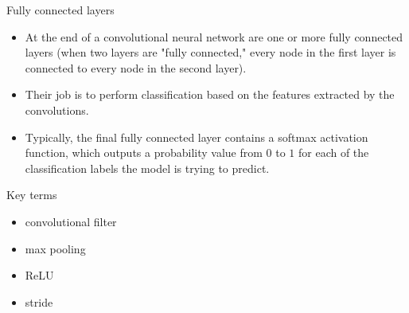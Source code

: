 \documentclass{beamer}
\begin{document}
\begin{frame}{Fully connected layers}
\begin{itemize}
\item At the end of a convolutional neural network are one or more fully connected layers (when two layers are "fully connected," every node in the first layer is connected to every node in the second layer). 
\item Their job is to perform classification based on the features extracted by the convolutions. 
\item Typically, the final fully connected layer contains a softmax activation function, which outputs a probability value from $0$ to $1$ for each of the classification labels the model is trying to predict.
\end{itemize}
\end{frame}

%

\begin{frame}{Key terms}
\begin{itemize}
\item convolutional filter
\item max pooling
\item ReLU
\item stride
\end{itemize}
\end{frame}
\end{document}
